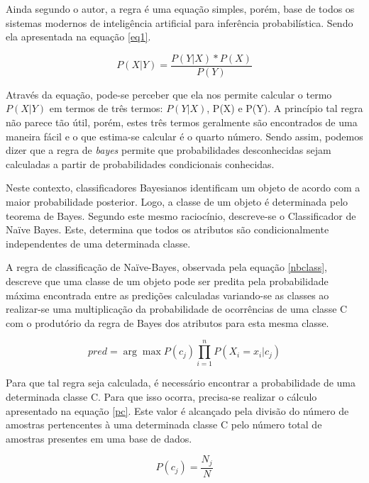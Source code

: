 \documentclass[12pt]{article}
\begin{document}
        Ainda segundo o autor, a regra é uma equação simples, porém, base de todos os sistemas modernos de inteligência artificial para inferência probabilística. Sendo ela apresentada na equação \ref{eq1}.
                
        \begin{equation} \label{eq1}
            P(X | Y) = \frac{P(Y | X) * P(X)}{P(Y)}
        \end{equation}
                
        Através da equação, pode-se perceber que ela nos permite calcular o termo $P(X | Y)$ em termos de três termos: $P(Y | X)$, P(X) e P(Y). A princípio tal regra não parece tão útil, porém, estes três termos geralmente são encontrados de uma maneira fácil e o que estima-se calcular é o quarto número. Sendo assim, podemos dizer que a regra de \textit{bayes} permite que probabilidades desconhecidas sejam calculadas a partir de probabilidades condicionais conhecidas.
    
        Neste contexto, classificadores Bayesianos identificam um objeto de acordo com a maior probabilidade posterior. Logo, a classe de um objeto é determinada pelo teorema de Bayes. Segundo este mesmo raciocínio, descreve-se o Classificador de Naïve Bayes. Este, determina que todos os atributos são condicionalmente independentes de uma determinada classe. 
        
        A regra de classificação de Naïve-Bayes, observada pela equação \ref{nbclass}, descreve que uma classe de um objeto pode ser predita pela probabilidade máxima encontrada entre as predições calculadas variando-se as classes ao realizar-se uma multiplicação da probabilidade de ocorrências de uma classe C com o produtório da regra de Bayes dos atributos para esta mesma classe.
    
        \begin{equation}\label{nbclass}
            pred = \arg\max P(c_j)\prod^{n}_{i=1}P(X_i = x_i | c_j)
        \end{equation}
        
        Para que tal regra seja calculada, é necessário encontrar a probabilidade de uma determinada classe C. Para que isso ocorra, precisa-se realizar o cálculo apresentado na equação \ref{pc}. Este valor é alcançado pela divisão do número de amostras pertencentes à uma determinada classe C pelo número total de amostras presentes em uma base de dados.
        
        \begin{equation}\label{pc}
           P(c_j) = \frac{N_j}{N}
        \end{equation}
        
\end{document}
